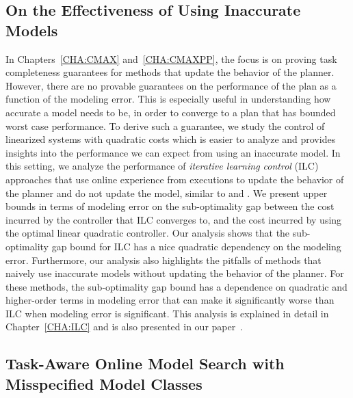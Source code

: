 \subsection{On the Effectiveness of Using Inaccurate Models}
\label{sec:effect-using-inacc}

In Chapters~\ref{CHA:CMAX} and~\ref{CHA:CMAXPP}, the focus is on proving task
completeness guarantees for methods that update the behavior of the planner.
However, there are no provable guarantees on the performance of the plan as a
function of the modeling error. This is especially useful in understanding how
accurate a model needs to be, in order to converge to a plan that has bounded
worst case performance. To derive such a guarantee, we study the control of
linearized systems with quadratic costs which is easier to analyze and provides insights
into the performance we can expect from using an inaccurate model. In this
setting, we analyze the performance of \textit{iterative learning control} (ILC)
approaches that use online experience from executions to update the behavior of
the planner and do not update the model, similar to \cmax{} and \cmaxpp{}. We
present upper bounds in terms of modeling error on the sub-optimality gap between the cost incurred by the
controller that ILC converges to, and the cost incurred by using the optimal
linear quadratic controller. Our analysis shows that the sub-optimality gap
bound for ILC has a nice quadratic dependency on the modeling error. Furthermore, our
analysis also highlights the
pitfalls of methods that naively use inaccurate models without updating the
behavior of the planner. For these methods, the sub-optimality gap bound has a
dependence on quadratic and higher-order terms in modeling error that can make it
significantly worse than ILC when modeling error is significant. This analysis
is explained in detail in Chapter~\ref{CHA:ILC} and is also presented in our
paper~\cite{ilc}.

\subsection{Task-Aware Online Model Search with Misspecified Model Classes}
\label{sec:task-aware-model}

